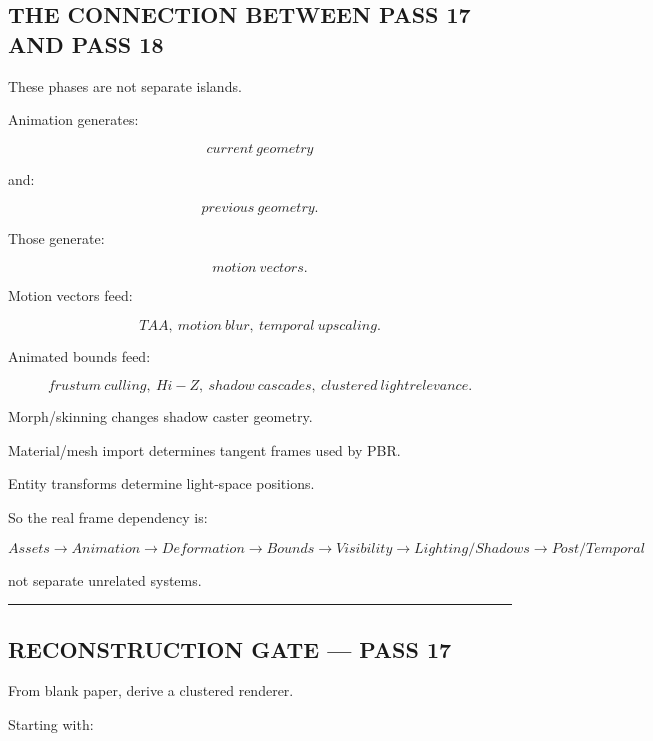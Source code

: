 \subsection{THE CONNECTION BETWEEN PASS 17 AND PASS 18}\label{04-visual-computing-ii-ch041-the-connection-between-pass-17-and-pass-18}

\hypertarget{04-visual-computing-ii-ch041-the-connection-between-pass-17-and-pass-18}{}

These phases are not separate islands.

Animation generates:

\[
current\ geometry
\]

and:

\[
previous\ geometry.
\]

Those generate:

\[
motion\ vectors.
\]

Motion vectors feed:

\[
TAA,\ motion\ blur,\ temporal\ upscaling.
\]

Animated bounds feed:

\[
frustum\ culling,\ Hi-Z,\ shadow\ cascades,\ clustered\ light relevance.
\]

Morph/skinning changes shadow caster geometry.

Material/mesh import determines tangent frames used by PBR.

Entity transforms determine light-space positions.

So the real frame dependency is:

\[
\boxed{
Assets
\rightarrow
Animation
\rightarrow
Deformation
\rightarrow
Bounds
\rightarrow
Visibility
\rightarrow
Lighting/Shadows
\rightarrow
Post/Temporal
}
\]

not separate unrelated systems.

\begin{center}\rule{0.5\linewidth}{0.5pt}\end{center}

\subsection{RECONSTRUCTION GATE --- PASS 17}\label{04-visual-computing-ii-ch041-reconstruction-gate-pass-17}

\hypertarget{04-visual-computing-ii-ch041-reconstruction-gate-pass-17}{}

From blank paper, derive a clustered renderer.

Starting with:

